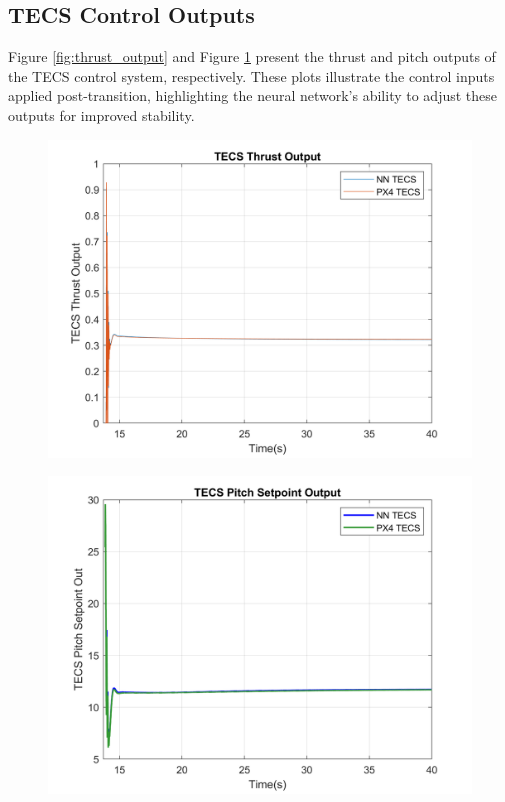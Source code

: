 \documentclass[journal,article,submit,pdftex,moreauthors]{Definitions/mdpi}
\begin{document}
\subsection{TECS Control Outputs}
Figure \ref{fig:thrust_output} and Figure \ref{fig:pitch_output} present the thrust and pitch outputs of the TECS control system, respectively. These plots illustrate the control inputs applied post-transition, highlighting the neural network's ability to adjust these outputs for improved stability.

\begin{figure}[H]
    \centering
    \begin{minipage}{0.45\textwidth}
        \centering
        \includegraphics[width=\linewidth]{thrust_output_plot.png}
        \label{fig:thrust_output}
    \end{minipage}
    \hfill
    \begin{minipage}{0.45\textwidth}
        \centering
        \includegraphics[width=\linewidth]{pitch_output_plot.png}
        \label{fig:pitch_output}
    \end{minipage}
\end{figure}
\end{document}
